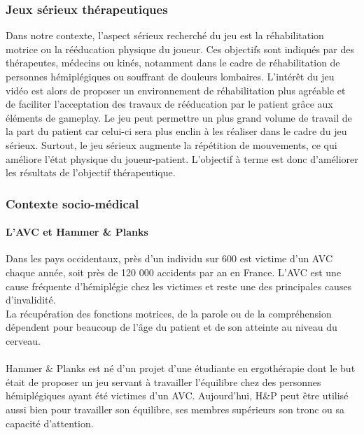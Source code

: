 	\subsubsection{Jeux sérieux thérapeutiques}
Dans notre contexte, l’aspect sérieux recherché du jeu est la réhabilitation motrice ou la rééducation physique du joueur. Ces objectifs sont indiqués par des thérapeutes, médecins ou kinés, notamment dans le cadre de réhabilitation de personnes hémiplégiques ou souffrant de douleurs lombaires. L’intérêt du jeu vidéo est alors de proposer un environnement de réhabilitation plus agréable et de faciliter l’acceptation des travaux de rééducation par le patient grâce aux éléments de gameplay. Le jeu peut permettre un plus grand volume de travail de la part du patient car celui-ci sera plus enclin à les réaliser dans le cadre du jeu sérieux. Surtout, le jeu sérieux augmente la répétition de mouvements, ce qui améliore l'état physique du joueur-patient. L’objectif à terme est donc d’améliorer les résultats de l’objectif thérapeutique.


	


	
	
		\subsubsection*{Contexte socio-médical}
		\paragraph{L'AVC et Hammer \& Planks\\}
Dans les pays occidentaux, près d'un individu sur 600 est victime d'un AVC chaque année, soit près de 120 000 accidents par an en France. L'AVC est une cause fréquente d'hémiplégie chez les victimes et reste une des principales causes d'invalidité. \\
La récupération des fonctions motrices, de la parole ou de la compréhension dépendent pour beaucoup de l'âge du patient et de son atteinte au niveau du cerveau.
\paragraph{}Hammer \& Planks est né d'un projet d'une étudiante en ergothérapie dont le but était de proposer un jeu servant à travailler l'équilibre chez des personnes hémiplégiques ayant été victimes d'un AVC. Aujourd'hui, H\&P peut être utilisé aussi bien pour travailler son équilibre, ses membres supérieurs son tronc ou sa capacité d'attention.


